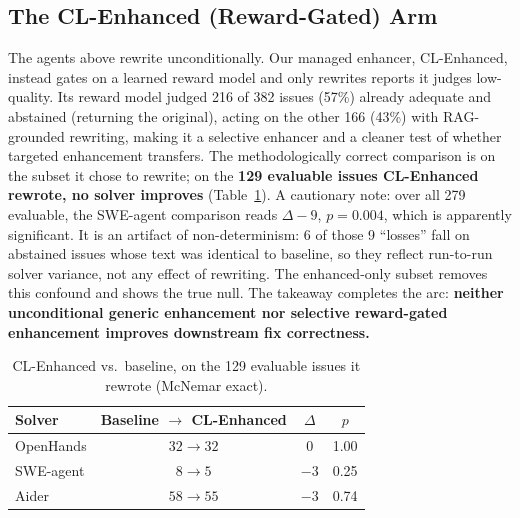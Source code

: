 \documentclass[journal]{IEEEtran}
\newcommand{\ourmethod}{CL-Enhanced}
\begin{document}
\subsection{The \ourmethod{} (Reward-Gated) Arm}
\label{sec:cl}
The agents above rewrite unconditionally. Our managed enhancer, \ourmethod{}, instead gates on a learned reward model and only rewrites reports it judges low-quality. Its reward model judged 216 of 382 issues (57\%) already adequate and abstained (returning the original), acting on the other 166 (43\%) with RAG-grounded rewriting, making it a selective enhancer and a cleaner test of whether targeted enhancement transfers. The methodologically correct comparison is on the subset it chose to rewrite; on the \textbf{129 evaluable issues \ourmethod{} rewrote, no solver improves} (Table~\ref{tab:cl}). A cautionary note: over all 279 evaluable, the SWE-agent comparison reads $\Delta{-}9$, $p=0.004$, which is apparently significant. It is an artifact of non-determinism: 6 of those 9 ``losses'' fall on abstained issues whose text was identical to baseline, so they reflect run-to-run solver variance, not any effect of rewriting. The enhanced-only subset removes this confound and shows the true null. The takeaway completes the arc: \textbf{neither unconditional generic enhancement nor selective reward-gated enhancement improves downstream fix correctness.}

\begin{table}[t]
\centering
\caption{\ourmethod{} vs.\ baseline, on the 129 evaluable issues it rewrote (McNemar exact).}
\label{tab:cl}
\begin{tabular}{@{}lccc@{}}
\toprule
Solver & Baseline $\rightarrow$ \ourmethod{} & $\Delta$ & $p$ \\
\midrule
OpenHands & $32 \rightarrow 32$ & $0$  & 1.00 \\
SWE-agent & $8 \rightarrow 5$   & $-3$ & 0.25 \\
Aider     & $58 \rightarrow 55$ & $-3$ & 0.74 \\
\bottomrule
\end{tabular}
\end{table}
\end{document}
